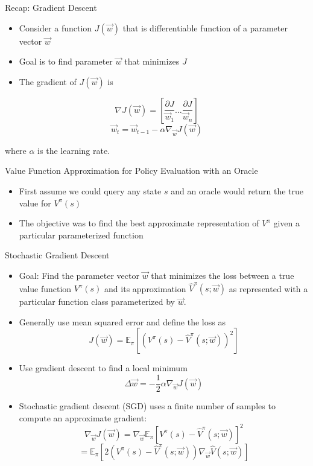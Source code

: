 \documentclass[aspectratio=169]{../latex_main/tntbeamer}  %
\begin{document}
\begin{frame}[c]{Recap: Gradient Descent}
	
	
	\begin{itemize}
		\item Consider a function $J(\vec{w})$ that is differentiable function of a parameter vector $\vec{w}$
		\item Goal is to find parameter $\vec{w}$ that minimizes $J$
		\item The gradient of $J(\vec{w})$ is 
	\end{itemize}
	$$
	\nabla J(\vec{w}) = \left[ \frac{\partial J}{\vec{w}_1} \ldots \frac{\partial J}{\vec{w}_n} \right]
	$$
	$$\vec{w}_t = \vec{w}_{t-1} - \alpha \nabla_{\vec{w}} J(\vec{w})$$
	
	where $\alpha$ is the learning rate.

	
\end{frame}
\begin{frame}[c]{Value Function Approximation for Policy Evaluation with
		an Oracle}
	
	
	\begin{itemize}
		\item First assume we could query any state $s$ and an \alert{oracle} would return
		the true value for $V^\pi (s)$
		\item The objective was to find the best approximate representation of $V^\pi$
		given a particular parameterized function
	\end{itemize}
	
\end{frame}
\begin{frame}[c]{Stochastic Gradient Descent}
	
	
	\begin{itemize}
		\item Goal: Find the parameter vector $\vec{w}$ that minimizes the loss between a
		true value function $V^\pi(s)$ and its approximation $\hat{V}^\pi(s; \vec{w})$ as
		represented with a particular function class parameterized by $\vec{w}$.
		\item Generally use mean squared error and define the loss as 
		$$ J(\vec{w}) = \mathbb{E}_\pi [(V^\pi(s) - \hat{V}^\pi(s;\vec{w}))^2]$$
		\item Use gradient descent to find a local minimum 
		$$ \Delta \vec{w} = - \frac{1}{2} \alpha \nabla_\vec{w} J(\vec{w})$$
		\item Stochastic gradient descent (SGD) uses a finite number of samples to compute an approximate gradient:
		$$ \nabla_\vec{w} J(\vec{w}) = \nabla_{\vec{w}} \mathbb{E}_\pi[V^\pi (s) - \hat{V}^\pi (s; \vec{w})]^2$$
		$$= \mathbb{E}_\pi [2 (V^\pi(s) - \hat{V}^\pi (s;\vec{w})) \nabla_\vec{w} \hat{V}(s;\vec{w})]$$
	\end{itemize}
	
\end{frame}
\end{document}
